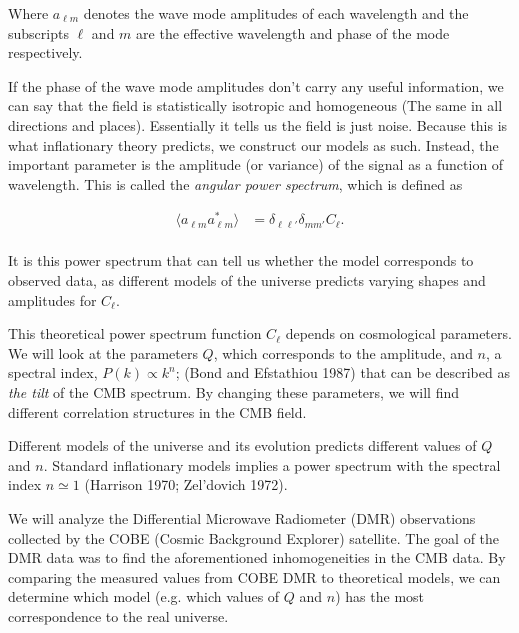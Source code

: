 \documentclass{emulateapj}
\begin{document}
\noindent
Where $a_{\ell m}$ denotes the wave mode amplitudes of each wavelength and the subscripts $\ell$ and $m$ are the effective wavelength and phase of the mode respectively. 

If the phase of the wave mode amplitudes don't carry any useful information, we can say that the field is statistically isotropic and homogeneous (The same in all directions and places). Essentially it tells us the field is just noise. Because this is what inflationary theory predicts, we construct our models as such. Instead, the important parameter is the amplitude (or variance) of the signal as a function of wavelength. This is called the \textit{angular power spectrum}, which is defined as

 \begin{equation}
 \label{angular_power_spec}
 \begin{array}{rl}
 \langle a_{\ell m}a_{\ell m}^*\rangle  &= \delta_{\ell \ell'}\delta_{mm'}C_{\ell}.\\
 \end{array}
 \end{equation}

\noindent 
It is this power spectrum that can tell us whether the model corresponds to observed data, %
as different models of the universe predicts varying shapes and
amplitudes for $C_{\ell}$.

This theoretical power spectrum function $C_{\ell}$ depends on cosmological parameters. We will look at the parameters $Q$, which corresponds to the amplitude, and $n$, a spectral index, $P(k) \propto k^n$; (Bond and Efstathiou 1987) that can be described as \textit{the tilt} of the CMB spectrum. By changing these parameters, we will find different correlation structures in the CMB field.

Different models of the universe and its evolution predicts different values of $Q$ and $n$. Standard inflationary models implies a power spectrum with the spectral index $n \simeq 1$ (Harrison 1970; Zel'dovich 1972). 

We will analyze the Differential Microwave Radiometer (DMR) observations collected by the COBE (Cosmic Background Explorer) satellite. The goal of the DMR data was to find the aforementioned inhomogeneities in the CMB data. By comparing the measured values from COBE DMR to theoretical models, we can determine which model (e.g. which values of $Q$ and $n$) has the most correspondence to the real universe. 
\end{document}
